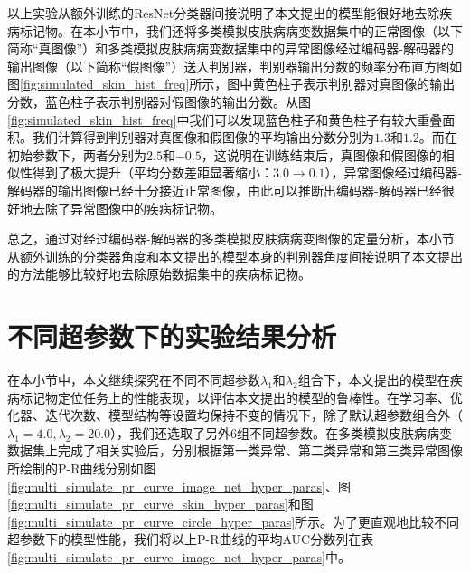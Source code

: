 以上实验从额外训练的ResNet分类器间接说明了本文提出的模型能很好地去除疾病标记物。在本小节中，我们还将多类模拟皮肤病病变数据集中的正常图像（以下简称“真图像”）和多类模拟皮肤病病变数据集中的异常图像经过编码器-解码器的输出图像（以下简称“假图像”）送入判别器，判别器输出分数的频率分布直方图如图\ref{fig:simulated_skin_hist_freq}所示，图中黄色柱子表示判别器对真图像的输出分数，蓝色柱子表示判别器对假图像的输出分数。从图\ref{fig:simulated_skin_hist_freq}中我们可以发现蓝色柱子和黄色柱子有较大重叠面积。我们计算得到判别器对真图像和假图像的平均输出分数分别为$1.3 $和$1.2$。而在初始参数下，两者分别为$2.5$和$-0.5$，这说明在训练结束后，真图像和假图像的相似性得到了极大提升（平均分数差距显著缩小：$3.0\rightarrow 0.1$），异常图像经过编码器-解码器的输出图像已经十分接近正常图像，由此可以推断出编码器-解码器已经很好地去除了异常图像中的疾病标记物。

总之，通过对经过编码器-解码器的多类模拟皮肤病病变图像的定量分析，本小节从额外训练的分类器角度和本文提出的模型本身的判别器角度间接说明了本文提出的方法能够比较好地去除原始数据集中的疾病标记物。
\section{不同超参数下的实验结果分析}\label{sec:multi_classes_hyper_paras}
在本小节中，本文继续探究在不同不同超参数$\lambda_{1}$和$\lambda_{2}$组合下，本文提出的模型在疾病标记物定位任务上的性能表现，以评估本文提出的模型的鲁棒性。在学习率、优化器、迭代次数、模型结构等设置均保持不变的情况下，除了默认超参数组合外（$\lambda_{1}=4.0,\lambda_{2}=20.0$），我们还选取了另外$6$组不同超参数。在多类模拟皮肤病病变数据集上完成了相关实验后，分别根据第一类异常、第二类异常和第三类异常图像所绘制的P-R曲线分别如图\ref{fig:multi_simulate_pr_curve_image_net_hyper_paras}、图\ref{fig:multi_simulate_pr_curve_skin_hyper_paras}和图\ref{fig:multi_simulate_pr_curve_circle_hyper_paras}所示。为了更直观地比较不同超参数下的模型性能，我们将以上P-R曲线的平均AUC分数列在表\ref{fig:multi_simulate_pr_curve_image_net_hyper_paras}中。

